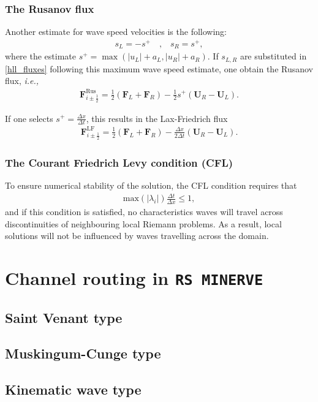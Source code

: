 \documentclass[a4paper]{article}
\numberwithin{equation}{section}
\newcommand{\ie}{\textit{i.e.,} }
\begin{document}
	\subsubsection{The Rusanov flux}
	Another estimate for wave speed velocities is the following:
	\begin{align}
		s_L = -s^{+} \quad \text{,} \quad s_R = s^{+},
	\end{align}
	where the estimate $s^{+}=\max(|u_L|+a_L,|u_R|+a_R)$. If $s_{L,R}$ are substituted in \ref{hll_fluxes} following this maximum wave speed estimate, one obtain the Rusanov flux, \ie
	\begin{align}
		\mathbf{F}_{i\pm\frac{1}{2}}^{\mathrm{Rus}}= \frac{1}{2}(\mathbf{F}_{L}+\mathbf{F}_{R}) - \frac{1}{2}s^{+}(\mathbf{U}_{R}-\mathbf{U}_{L}).
	\end{align}

	If one selects $s^{+}=\frac{\Delta x}{\Delta t}$, this results in the Lax-Friedrich flux
	\begin{align}
	\mathbf{F}_{i\pm\frac{1}{2}}^{\mathrm{LF}}= \frac{1}{2}(\mathbf{F}_{L}+\mathbf{F}_{R}) - \frac{\Delta x}{2\Delta t}(\mathbf{U}_{R}-\mathbf{U}_{L}).
	\end{align}
	
	\subsubsection{The Courant Friedrich Levy condition (CFL)}
	To ensure numerical stability of the solution, the CFL condition requires that 
	\begin{align}
		\mathrm{max}(|\lambda_i|)\frac{\Delta t}{\Delta x} \leq 1,
	\end{align}
	and if this condition is satisfied, no characteristics waves will travel across discontinuities of neighbouring local Riemann problems. As a result, local solutions will not be influenced by waves travelling across the domain.
		
	\section{Channel routing in \texttt{RS MINERVE}}
	\subsection{Saint Venant type}
	\subsection{Muskingum-Cunge type}
	\subsection{Kinematic wave type}





	\newpage
	\printbibliography[title={References}]
\end{document}
